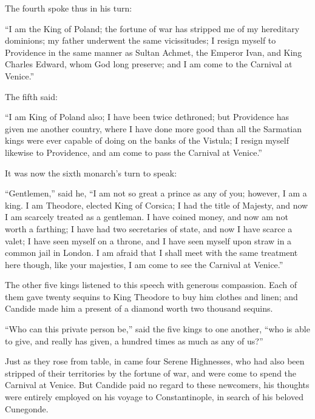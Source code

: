 The fourth spoke thus in his turn:

``I am the King of Poland; the fortune of war has stripped me of my hereditary dominions; my father underwent the same vicissitudes; I resign myself to Providence in the same manner as Sultan Achmet, the Emperor Ivan, and King Charles Edward, whom God long preserve; and I am come to the Carnival at Venice.''

The fifth said:

``I am King of Poland also; I have been twice dethroned; but Providence has given me another country, where I have done more good than all the Sarmatian kings were ever capable of doing on the banks of the Vistula; I resign myself likewise to Providence, and am come to pass the Carnival at Venice.''

It was now the sixth monarch's turn to speak:

``Gentlemen,'' said he, ``I am not so great a prince as any of you; however, I am a king. I am Theodore, elected King of Corsica; I had the title of Majesty, and now I am scarcely treated as a gentleman. I have coined money, and now am not worth a farthing; I have had two secretaries of state, and now I have scarce a valet; I have seen myself on a throne, and I have seen myself upon straw in a common jail in London. I am afraid that I shall meet with the same treatment here though, like your majesties, I am come to see the Carnival at Venice.''

The other five kings listened to this speech with generous compassion. Each of them gave twenty sequins to King Theodore to buy him clothes and linen; and Candide made him a present of a diamond worth two thousand sequins.

``Who can this private person be,'' said the five kings to one another, ``who is able to give, and really has given, a hundred times as much as any of us?''

Just as they rose from table, in came four Serene Highnesses, who had also been stripped of their territories by the fortune of war, and were come to spend the Carnival at Venice. But Candide paid no regard to these newcomers, his thoughts were entirely employed on his voyage to Constantinople, in search of his beloved Cunegonde.


